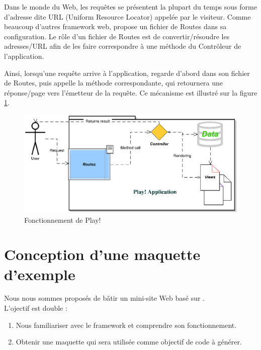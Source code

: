 Dans le monde du Web, les requêtes se présentent la plupart du temps sous forme d'adresse dite URL (Uniform Resource Locator) appelée par le visiteur. Comme beaucoup d'autres framework web, \kwplay{} propose un fichier de Routes dans sa configuration. Le rôle d'un fichier de Routes est de convertir/résoudre les adresses/URL afin de les faire correspondre à une méthode du Contrôleur de l'application.

Ainsi, lorsqu'une requête arrive à l'application, \kwplay{} regarde d'abord dans son fichier de Routes, puis appelle la méthode correspondante, qui retournera une réponse/page vers l'émetteur de la requête. Ce mécanisme est illustré sur la figure \ref{fig:play_sch}.

\begin{figure}[htb]
  \centering
  \includegraphics[scale=.8]{img/play_scheme.eps}
  \caption{Fonctionnement de Play!}
  \label{fig:play_sch}
\end{figure}

\section{Conception d’une maquette d’exemple}\label{sec:pro}

Nous nous sommes proposés de bâtir un mini-site Web basé sur \kwplay{}.
\\
L'ojectif est double :
\begin{enumerate}
\item Nous familiariser avec le framework \kwplay{} et comprendre son fonctionnement.
\item Obtenir une maquette qui sera utilisée comme objectif de code à générer.
\end{enumerate}

